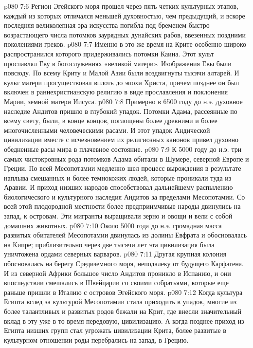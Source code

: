 \vs p080 7:6 Регион Эгейского моря прошел через пять четких культурных этапов, каждый из которых отличался меньшей духовностью, чем предыдущий, и вскоре последняя великолепная эра искусства погибла под бременем быстро возрастающего числа потомков заурядных дунайских рабов, ввезенных поздними поколениями греков.
\vs p080 7:7 Именно в это же время на Крите особенно широко распространился  которого придерживались потомки Каина. Этот культ прославлял Еву в богослужениях «великой матери». Изображения Евы были повсюду. По всему Криту и Малой Азии были воздвигнуты тысячи алтарей. И культ матери просуществовал вплоть до эпохи Христа, причем позднее он был включен в раннехристианскую религию в виде прославления и поклонения Марии, земной матери Иисуса.
\vs p080 7:8 \pc Примерно в 6500 году до н.э. духовное наследие Андитов пришло в глубокий упадок. Потомки Адама, рассеянные по всему свету, были, в конце концов, поглощены более древними и более многочисленными человеческими расами. И этот упадок Андической цивилизации вместе с исчезновением их религиозных канонов привел духовно обедненные расы мира в плачевное состояние.
\vs p080 7:9 \pc К 5000 году до н.э. три самых чистокровных рода потомков Адама обитали в Шумере, северной Европе и Греции. По всей Месопотамии медленно шел процесс вырождения в результате наплыва смешанных и более темнокожих людей, которые проникали туда из Аравии. И приход низших народов способствовал дальнейшему распылению биологического и культурного наследия Андитов за пределами Месопотамии. Со всей этой плодородной местности более предприимчивые народы двинулись на запад, к островам. Эти мигранты выращивали зерно и овощи и вели с собой домашних животных.
\vs p080 7:10 Около 5000 года до н.э. громадная масса развитых обитателей Месопотамии двинулась из долины Евфрата и обосновалась на Кипре; приблизительно через две тысячи лет эта цивилизация была уничтожена ордами северных варваров.
\vs p080 7:11 \pc Другая крупная колония обосновалась на берегу Средиземного моря, неподалеку от будущего Карфагена. И из северной Африки большое число Андитов проникло в Испанию, и они впоследствии смешались в Швейцарии со своими собратьями, которые еще раньше пришли в Италию с островов Эгейского моря.
\vs p080 7:12 \pc Когда культура Египта вслед за культурой Месопотамии стала приходить в упадок, многие из более талантливых и развитых родов бежали на Крит, где внесли значительный вклад в эту уже в то время передовую, цивилизацию. А когда позднее приход из Египта низших групп стал угрожать цивилизации Крита, более развитые в культурном отношении роды перебрались на запад, в Грецию.
